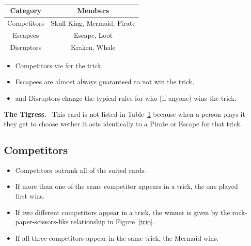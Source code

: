 \documentclass{article}
\newcommand{\block}[2][\medskip]{#1\noindent\textbf{#2.}\ }
\begin{document}
\begin{table}
\centering
\caption{}
\label{special-categories}
\begin{tabular}{|*{2}{c|}}
\hline
Category & Members \\
\hline
Competitors & Skull King, Mermaid, Pirate \\
\hline
Escapees & Escape, Loot \\
\hline
Disruptors & Kraken, Whale \\
\hline
\end{tabular}
\end{table}

\begin{itemize}
\item Competitors vie for the trick,
\item Escapees are almost always guaranteed to not win the trick,
\item and Disruptors change the typical rules for who (if anyone) wins the trick.
\end{itemize}

\block{The Tigress} This card is not listed in Table~\ref{special-categories} because when a person plays it they get to choose wether it acts identically to a Pirate or Escape for that trick.

\subsection{Competitors}
\begin{itemize}
\item Competitors outrank all of the suited cards.
\item If more than one of the same competitor appears in a trick, the one played first wins.
\item If two different competitors appear in a trick, the winner is given by the rock-paper-scissors-like relationship in Figure~\ref{trio}.
\item If all three competitors appear in the same trick, the Mermaid wins.
\end{itemize}
\end{document}
